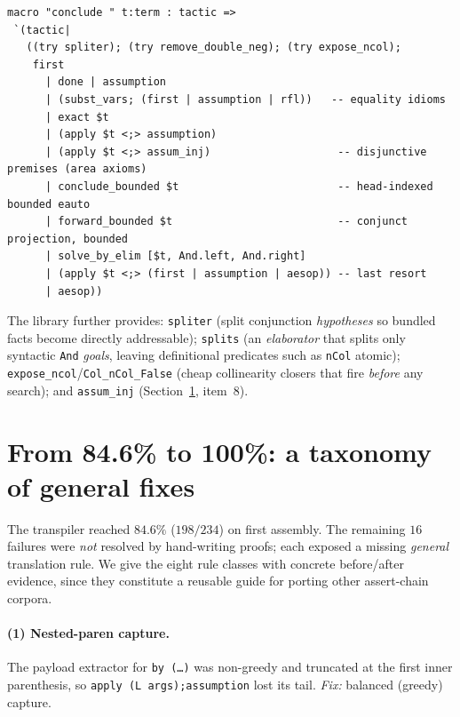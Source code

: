 \documentclass{article}
\begin{document}
\begin{lstlisting}[caption={The \texttt{conclude} macro (abridged). The preamble normalizes the context; the cascade tries the cheapest closers first and reaches the bounded, head-indexed \texttt{conclude\_bounded} (the faithful \texttt{eauto} port) before any unbounded search.},label={lst:conclude},float=t]
macro "conclude " t:term : tactic =>
 `(tactic|
   ((try spliter); (try remove_double_neg); (try expose_ncol);
    first
      | done | assumption
      | (subst_vars; (first | assumption | rfl))   -- equality idioms
      | exact $t
      | (apply $t <;> assumption)
      | (apply $t <;> assum_inj)                    -- disjunctive premises (area axioms)
      | conclude_bounded $t                         -- head-indexed bounded eauto
      | forward_bounded $t                          -- conjunct projection, bounded
      | solve_by_elim [$t, And.left, And.right]
      | (apply $t <;> (first | assumption | aesop)) -- last resort
      | aesop))
\end{lstlisting}

The library further provides: \texttt{spliter} (split conjunction \emph{hypotheses} so bundled
facts become directly addressable); \texttt{splits} (an \emph{elaborator} that splits only
syntactic \texttt{And} \emph{goals}, leaving definitional predicates such as \texttt{nCol}
atomic); \texttt{expose\_ncol}/\texttt{Col\_nCol\_False} (cheap collinearity closers that fire
\emph{before} any search); and \texttt{assum\_inj} (Section~\ref{sec:taxonomy}, item~8).

\section{From 84.6\% to 100\%: a taxonomy of general fixes}
\label{sec:taxonomy}

The transpiler reached $84.6\%$ ($198/234$) on first assembly. The remaining $16$ failures were
\emph{not} resolved by hand-writing proofs; each exposed a missing \emph{general} translation
rule. We give the eight rule classes with concrete before/after evidence, since they constitute
a reusable guide for porting other assert-chain corpora.

\paragraph{(1) Nested-paren capture.} The payload extractor for \texttt{by (\ldots)} was
non-greedy and truncated at the first inner parenthesis, so
\texttt{apply (L args);assumption} lost its tail. \emph{Fix:} balanced (greedy) capture.
\end{document}
